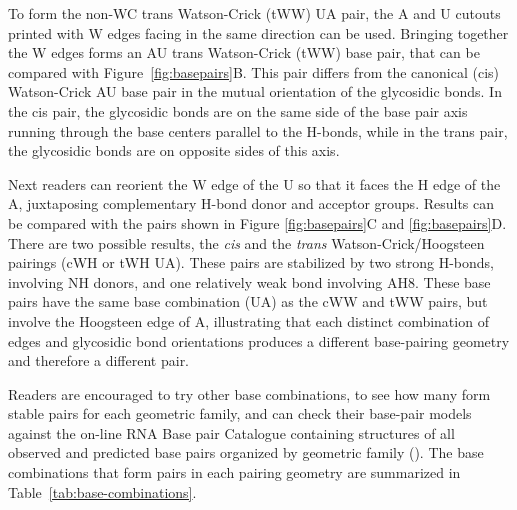 To form the non-WC trans Watson-Crick (tWW) UA pair, the A and U cutouts printed
with W edges facing in the same direction can be used.  Bringing together the W
edges forms an AU trans Watson-Crick (tWW) base pair, that can be compared with
Figure~\ref{fig:basepairs}B. This pair differs from the canonical (cis) Watson-Crick AU base pair
in the mutual orientation of the glycosidic bonds. In the cis pair, the
glycosidic bonds are on the same side of the base pair axis running through the
base centers parallel to the H-bonds, while in the trans pair, the glycosidic
bonds are on opposite sides of this axis.  

Next readers can reorient the W edge of the U so that it faces the H edge of the
A, juxtaposing complementary H-bond donor and acceptor groups. Results can be
compared with the pairs shown in Figure \ref{fig:basepairs}C and
\ref{fig:basepairs}D. There are two possible results, the \emph{cis} and the
\emph{trans} Watson-Crick/Hoogsteen pairings (cWH or tWH UA). These pairs are
stabilized by two strong H-bonds, involving NH donors, and one relatively weak
bond involving AH8. These base pairs have the same base combination (UA) as the
cWW and tWW pairs, but involve the Hoogsteen edge of A, illustrating that each
distinct combination of edges and glycosidic bond orientations produces a
different base-pairing geometry and therefore a different pair. 

Readers are encouraged to try other base combinations, to see how many form
stable pairs for each geometric family, and can check their base-pair models
against the on-line RNA Base pair Catalogue containing structures of all
observed and predicted base pairs organized by geometric family
(). The base combinations that form
pairs in each pairing geometry are summarized in Table~\ref{tab:base-combinations}.

